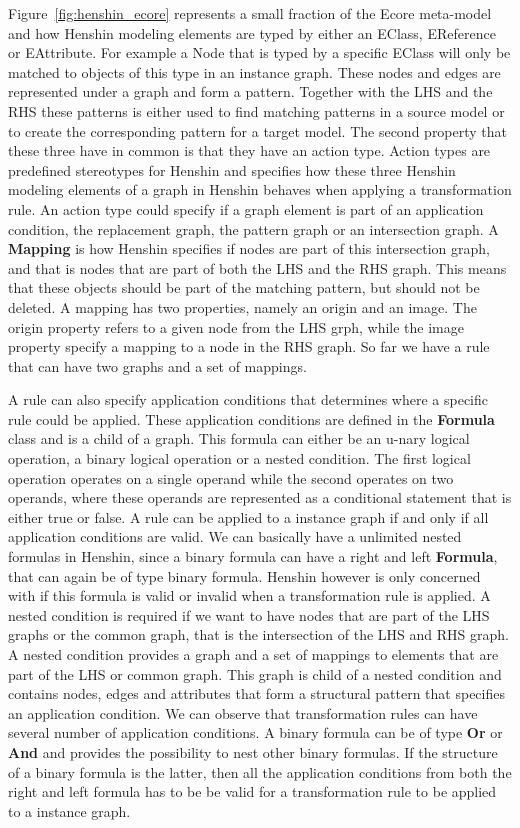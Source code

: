 Figure~\ref{fig:henshin_ecore} represents a small fraction of the Ecore
meta-model and how Henshin modeling elements are typed by either an EClass,
EReference or EAttribute. For example a Node that is typed by a specific EClass
will only be matched to objects of this type in an instance graph. These nodes
and edges are represented under a graph and form a pattern. Together with the
LHS and the RHS these patterns is either used to find matching patterns in a
source model or to create the corresponding pattern for a target model. The
second property that these three have in common is that they have an action
type. Action types are predefined stereotypes for Henshin and specifies how
these three Henshin modeling elements of a graph in Henshin behaves when
applying a transformation rule. An action type could specify if a graph element
is part of an application condition, the replacement graph, the pattern graph
or an intersection graph. A \textbf{Mapping} is how Henshin specifies if nodes
are part of this intersection graph, and that is nodes that are part of both
the LHS and the RHS graph. This means that these objects should be part of the
matching pattern, but should not be deleted. A mapping has two properties,
namely an origin and an image. The origin property refers to a given node from
the LHS grph, while the image property specify a mapping to a node in the RHS
graph. So far we have a rule that can have two graphs and a set of mappings. 

A rule can also specify application conditions that determines where a specific
rule could be applied. These application conditions are defined in the
\textbf{Formula} class and is a child of a graph. This formula can either be an
u-nary logical operation, a binary logical operation or a nested condition. The
first logical operation operates on a single operand while the second operates on two
operands, where these operands are represented as a conditional statement that
is either true or false. A rule can be applied to a instance graph if and only
if all application conditions are valid. We can basically have a unlimited
nested formulas in Henshin, since a binary formula can have a right and left
\textbf{Formula}, that can again be of type binary formula. Henshin however is
only concerned with if this formula is valid or invalid when a transformation
rule is applied. A nested condition is required if we want to have nodes that
are part of the LHS graphs or the common graph, that is the intersection of the
LHS and RHS graph. A nested condition provides a graph and a set of mappings to
elements that are part of the LHS or common graph. This graph is child of
a nested condition and contains nodes, edges and attributes that form a
structural pattern that specifies an application condition. We can observe that
transformation rules can have several number of application conditions. A
binary formula can be of type \textbf{Or} or \textbf{And} and provides the
possibility to nest other binary formulas. If the structure of a binary formula
is the latter, then all the application conditions from both the right and left
formula has to be be valid for a transformation rule to be applied to a
instance graph.

